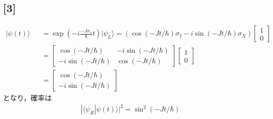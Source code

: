 \documentclass[12pt,dvipdfmx]{jsarticle}
\begin{document}
\subsection*{\large{[3]}}
\begin{eqnarray}
  |\psi(t)\rangle &&= \exp\left( -i\frac{-J\sigma_x}{\hbar}t \right)|\psi_L\rangle =
  \left( \cos(-Jt/\hbar)\sigma_I-i\sin(-Jt/\hbar)\sigma_X \right)
  \begin{bmatrix}
    1\\
    0
  \end{bmatrix}\\
  &&=
  \begin{bmatrix}
    \cos(-Jt/\hbar) & -i\sin(-Jt/\hbar)\\
    -i\sin(-Jt/\hbar) & \cos(-Jt/\hbar)
  \end{bmatrix}
  \begin{bmatrix}
    1\\
    0
  \end{bmatrix}\\
  &&= 
  \begin{bmatrix}
    \cos(-Jt/\hbar)\\
    -i\sin(-Jt/\hbar)
  \end{bmatrix}
\end{eqnarray}
となり，確率は
\begin{eqnarray}
  |\langle \psi_R| \psi(t)\rangle|^2 = \sin^2(-Jt/\hbar)
\end{eqnarray}
\end{document}
